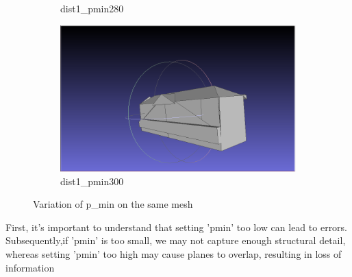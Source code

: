 \documentclass{article}
\begin{document}
\begin{figure}[H]
\begin{subfigure}[b]{0.45\textwidth}
    \caption{dist1\_pmin280}
    \label{fig:dist1_pmin280}
  \end{subfigure}
  \hfill
  \begin{subfigure}[b]{0.45\textwidth}
    \includegraphics[width=\textwidth]{../../images/screen_kinetic/dist1_pmin300.png}
    \caption{dist1\_pmin300}
    \label{fig:dist1_pmin300}
  \end{subfigure}
  \caption{Variation of p\_min on the same mesh}
  \label{fig:ensemble_images}
\end{figure}
  
  First, it's important to understand that setting 'pmin' too low can lead to errors. Subsequently,if 'pmin' is too small, we may not capture enough structural detail,
  whereas setting 'pmin' too high may cause planes to overlap, resulting in loss of information
\end{document}

